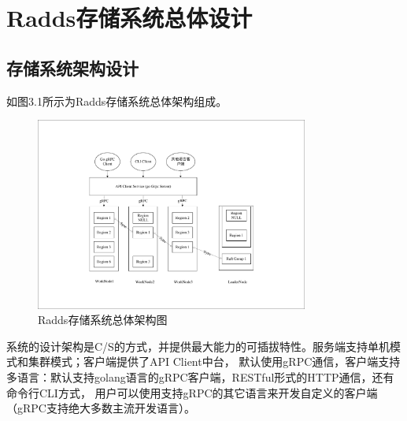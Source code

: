 \section{Radds存储系统总体设计}

	\subsection{存储系统架构设计}

	如图3.1所示为Radds存储系统总体架构组成。
	
	\begin{figure}[H]
		\centering
		\includegraphics[width=0.80\textwidth]{pdf/radds_system_arch.pdf}
		\caption{Radds存储系统总体架构图}
		\label{overall_structure}
	\end{figure}

		系统的设计架构是C/S的方式，并提供最大能力的可插拔特性。服务端支持单机模式和集群模式；客户端提供了API Client中台，
		默认使用gRPC通信，客户端支持多语言：默认支持golang语言的gRPC客户端，RESTful形式的HTTP通信，还有命令行CLI方式，
		用户可以使用支持gRPC的其它语言来开发自定义的客户端（gRPC支持绝大多数主流开发语言）。
		
